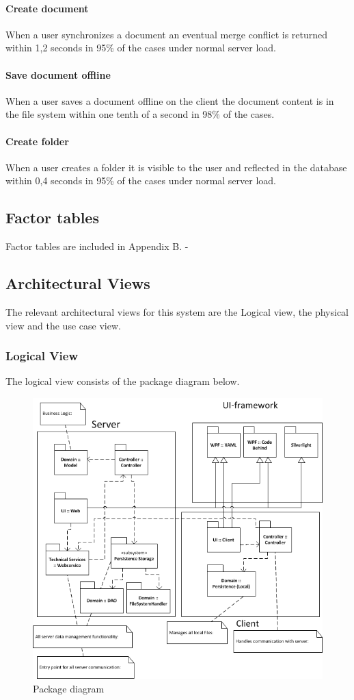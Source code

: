 \documentclass[a4paper,11pt,report]{report}
\begin{document}
\paragraph{Create document} When a user synchronizes a document an eventual merge conflict is returned within 1,2 seconds in 95\% of the cases under normal server load.
\paragraph{Save document offline} When a user saves a document offline on the client the document content is in the file system within one tenth of a second in 98\% of the cases.
\paragraph{Create folder} When a user creates a folder it is visible to the user and reflected in the database within 0,4 seconds in 95\% of the cases under normal server load.

\subsection{Factor tables}
Factor tables are included in Appendix B.
- 
\subsection{Architectural Views}
The relevant architectural views for this system are the Logical view, the physical view and the use case view.
\newpage
\subsubsection{Logical View}
The logical view consists of the package diagram below.
\begin{figure}[H]
  \centering
\includegraphics[]{./logicalview}
\caption{Package diagram}
\end{figure}
\newpage
\end{document}
